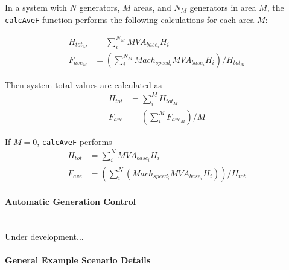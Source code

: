 \documentclass[12pt]{article}
\begin{document}
In a system with $N$ generators, $M$ areas, and $N_M$ generators in area $M$, the \verb|calcAveF| function performs the following calculations for each area $M$:

\begin{align*}
%             
%         
H_{tot_M} &= \sum_{i}^{N_M} MVA_{base_i}H_i \\
F_{ave_M} &= \left( \sum_{i}^{N_M}Mach_{speed_i}MVA_{base_i}H_i \right) / H_{tot_M}
\end{align*}

Then system total values are calculated as
\begin{align*}
H_{tot} &= \sum_{i}^{M} H_{tot_M} \\
F_{ave} &= \left( \sum_{i}^{M} F_{ave_M} \right)/M
\end{align*}

If $M=0$, \verb|calcAveF| performs
\begin{align*}
H_{tot} &= \sum_{i}^{N} MVA_{base_i}H_i \\
F_{ave} &= \left( \sum_{i}^{N}(Mach_{speed_i}MVA_{base_i}H_i) \right) / H_{tot}
\end{align*}

\paragraph{Automatic Generation Control} \ \\
Under development...


\pagebreak
\paragraph{General Example Scenario Details} \ \\
\end{document}
